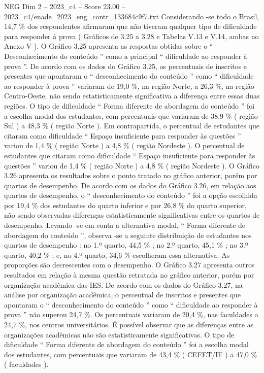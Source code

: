 \begin{textsample}{NEG Dim 2 – 2023\_c4 – Score 23.00 – 2023\_c4/enade\_2023\_eng\_contr\_133684c9f7.txt}
Considerando -se todo o Brasil, 14,7 \% dos respondentes afirmaram que não tiveram qualquer tipo de dificuldade para responder à prova ( Gráficos de 3.25 a 3.28 e Tabelas V.13 e V.14, ambas no Anexo V ).
O Gráfico 3.25 apresenta as respostas obtidas sobre o “ Desconhecimento do conteúdo ” como a principal “ dificuldade ao responder à prova ”.
De acordo com os dados do Gráfico 3.25, os percentuais de inscritos e presentes que apontaram o “ desconhecimento do conteúdo ” como “ dificuldade ao responder à prova ” variaram de 19,0 \%, na região Norte, a 26,3 \%, na região Centro-Oeste, não sendo estatisticamente significativa a diferença entre essas duas regiões.
O tipo de dificuldade “ Forma diferente de abordagem do conteúdo ” foi a escolha modal dos estudantes, com percentuais que variaram de 38,9 \% ( região Sul ) a 48,3 \% ( região Norte ).
Em contrapartida, o percentual de estudantes que citaram como dificuldade “ Espaço insuficiente para responder às questões ” variou de 1,4 \% ( região Norte ) a 4,8 \% ( região Nordeste ).
O percentual de estudantes que citaram como dificuldade “ Espaço insuficiente para responder às questões ” variou de 1,4 \% ( região Norte ) a 4,8 \% ( região Nordeste ).
O Gráfico 3.26 apresenta os resultados sobre o ponto tratado no gráfico anterior, porém por quartos de desempenho.
De acordo com os dados do Gráfico 3.26, em relação aos quartos de desempenho, o “ desconhecimento do conteúdo ” foi a opção escolhida por 19,4 \% dos estudantes do quarto inferior e por 26,8 \% do quarto superior, não sendo observadas diferenças estatisticamente significativas entre os quartos de desempenho.
Levando -se em conta a alternativa modal, “ Forma diferente de abordagem do conteúdo ”, observa -se a seguinte distribuição de estudantes nos quartos de desempenho : no 1.º quarto, 44,5 \% ; no 2.º quarto, 45,1 \% ; no 3.º quarto, 40,2 \% ; e, no 4.º quarto, 34,6 \% escolheram essa alternativa.
As proporções são decrescentes com o desempenho.
O Gráfico 3.27 apresenta outros resultados em relação à mesma questão retratada no gráfico anterior, porém por organização acadêmica das IES.
De acordo com os dados do Gráfico 3.27, na análise por organização acadêmica, o percentual de inscritos e presentes que apontaram o “ desconhecimento do conteúdo ” como “ dificuldade ao responder à prova ” não superou 24,7 \%.
Os percentuais variaram de 20,4 \%, nas faculdades a 24,7 \%, nos centros universitários.
É possível observar que as diferenças entre as organizações acadêmicas não são estatisticamente significativas.
O tipo de dificuldade “ Forma diferente de abordagem do conteúdo ” foi a escolha modal dos estudantes, com percentuais que variaram de 43,4 \% ( CEFET/IF ) a 47,0 \% ( faculdades ).

\end{textsample}
